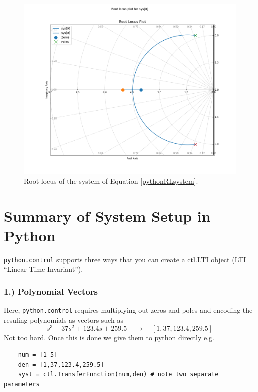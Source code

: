 \begin{figure}[b]
    \includegraphics[width=\textwidth]{figs08/B31H79.png}
    \caption{Root locus of the system of Equation \ref{pythonRLsystem}.}\label{pythonRLoutput}
\end{figure}

\clearpage
\section{Summary of System Setup in Python}
{\tt python.control} supports three ways that you can create a ctl.LTI object (LTI = ``Linear Time Invariant'').

\subsubsection{1.) Polynomial Vectors}
Here, {\tt python.control} requires multiplying out zeros and  poles and encoding
the resuling polynomials as vectors such as
\[
s^3 + 37s^2 + 123.4s + 259.5 \quad \to \quad [1, 37, 123.4, 259.5]
\]
Not too hard.  Once this is done we give them to python directly e.g.

\begin{verbatim}
    num = [1 5]
    den = [1,37,123.4,259.5]
    syst = ctl.TransferFunction(num,den) # note two separate parameters
\end{verbatim}

